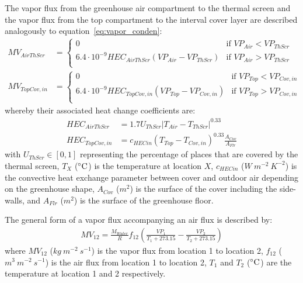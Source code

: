 \documentclass[a4paper]{article}
\numberwithin{equation}{section}
\begin{document}
The vapor flux from the greenhouse air compartment to the thermal screen and the vapor flux from the top compartment to the interval cover layer are described analogously to equation~\eqref{eq:vapor_conden}:
\begin{align}
  MV_{AirThScr}  & = \begin{cases}
    0                                                       & \text{if~} VP_{Air} < VP_{ThScr} \\
    6.4 \cdot 10^{-9} HEC_{AirThScr}(VP_{Air} - VP_{ThScr}) & \text{if~} VP_{Air} > VP_{ThScr} \\
  \end{cases} \\
  MV_{TopCov,in} & = \begin{cases}
    0                                                         & \text{if~} VP_{Top} < VP_{Cov,in} \\
    6.4 \cdot 10^{-9} HEC_{TopCov,in}(VP_{Top} - VP_{Cov,in}) & \text{if~} VP_{Top} > VP_{Cov,in} \\
  \end{cases}
\end{align}
whereby their associated heat change coefficients are:
\begin{align}
  HEC_{AirThScr}  & = 1.7 U_{ThScr} |T_{Air} - T_{ThScr}|^{0.33}                        \\
  HEC_{TopCov,in} & = {c_{HECin} (T_{Top} - T_{Cov,in})}^{0.33} \frac{A_{Cov}}{A_{Flr}}
\end{align}
with \(U_{ThScr} \in [0,1]\) representing the percentage of places that are covered by the thermal screen, \(T_X\) (\(\celsius\)) is the temperature at location \(X\), \(c_{HECin}\) (\(W\ m^{-2}\ K^{-2}\)) is the convective heat exchange parameter between cover and outdoor air depending on the greenhouse shape, \(A_{Cov}\) (\(m^2\)) is the surface of the cover including the side-walls, and \(A_{Flr}\) (\(m^2\)) is the surface of the greenhouse floor.

The general form of a vapor flux accompanying an air flux is described by:
\begin{align}
  \label{eq:vapor_air}
  MV_{12} = \frac{M_{Water}}{R} f_{12} \left(\frac{VP_1}{T_1 + 273.15} - \frac{VP_2}{T_2 + 273.15}\right)
\end{align}
where \(MV_{12}\) (\(kg\ m^{-2}\ s^{-1}\)) is the vapor flux from location 1 to location 2, \(f_{12}\) (\(m^3\ m^{-2}\ s^{-1}\)) is the air flux from location 1 to location 2, \(T_1\) and \(T_2\) (\(\celsius\)) are the temperature at location 1 and 2 respectively.
\end{document}
